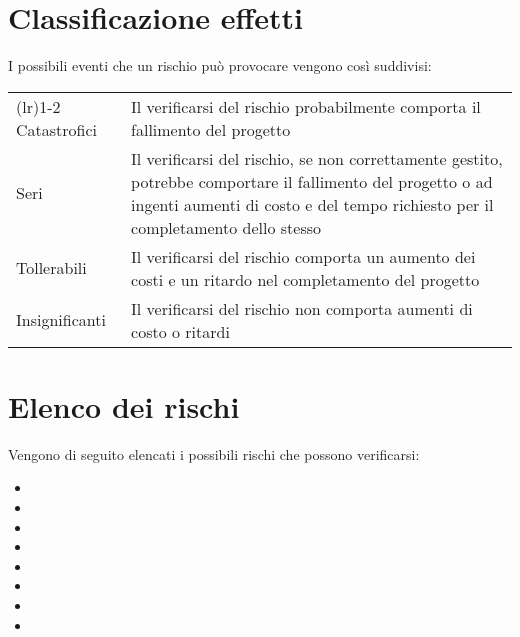 \section{Classificazione effetti}
I possibili eventi che un rischio può provocare vengono così suddivisi:
\begin{center}
	\begin{tabularx}{\tabwidthiter}{ l  X } 
		\toprule
			\fromattaTitoloTab{Classificazione} & \fromattaTitoloTab{Effetti} \\
		\cmidrule(l{\cmidrulekern}r{\cmidrulekern}){1-2}
			Catastrofici & Il verificarsi del rischio probabilmente comporta il fallimento del progetto \\ 
			\addlinespace[1em] 
			Seri & Il verificarsi del rischio, se non correttamente gestito, potrebbe comportare il fallimento del progetto o ad ingenti aumenti di costo e del tempo richiesto per il completamento dello stesso \\ 
			\addlinespace[1em] 
			Tollerabili & Il verificarsi del rischio comporta un aumento dei costi e un ritardo nel completamento del progetto  \\ 
			\addlinespace[1em] 
			Insignificanti & Il verificarsi del rischio non comporta aumenti di costo o ritardi \\
		\bottomrule
	\end{tabularx}
\end{center}

\section{Elenco dei rischi}
Vengono di seguito elencati i possibili rischi che possono verificarsi:
\begin{itemize}
	\item {}
	\item {}
	\item {}
	\item {}
	\item {}
	\item {}
	\item {}
	\item {}
\end{itemize}

